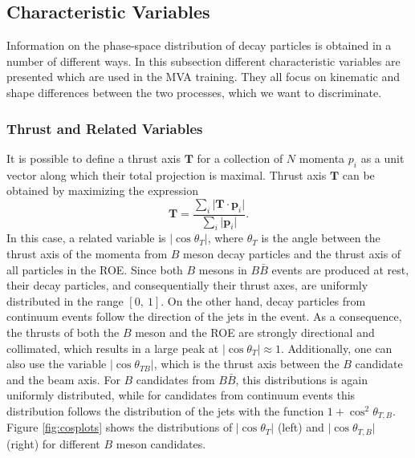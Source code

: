 \subsection{Characteristic Variables}
\label{ss:charvar}
Information on the phase-space distribution of decay particles is obtained in a number of different ways. In this subsection different characteristic variables are presented which are used in the MVA training. They all focus on kinematic and shape differences between the two processes, which we want to discriminate. 


\subsubsection{Thrust and Related Variables}
It is possible to define a thrust axis $\mathbf{T}$ for a collection of $N$ momenta $p_i$ as a unit vector along which their total projection is maximal. Thrust axis $\mathbf T$ can be obtained by maximizing the expression
\begin{equation}
\mathbf{T} = \frac{\sum_{i}\vert \mathbf{T} \cdot \mathbf{p}_i\vert}{\sum_{i}\vert \mathbf{p}_i\vert}.
\end{equation}
In this case, a related variable is $\vert \cos\theta_T\vert$, where $\theta_T$ is the angle between the thrust axis of the momenta from $B$ meson decay particles and the thrust axis of all particles in the ROE. Since both $B$ mesons in $B \bar B$ events are produced at rest, their decay particles, and consequentially their thrust axes, are uniformly distributed in the range $[0,~1]$. On the other hand, decay particles from continuum events follow the direction of the jets in the event. As a consequence, the thrusts of both the $B$ meson and the ROE are strongly directional and collimated, which results in a large peak at $\vert \cos\theta_T\vert \approx 1$. Additionally, one can also use the variable $\vert \cos\theta_{TB}\vert $, which is the thrust axis between the $B$ candidate and the beam axis. For $B$ candidates from $B \bar B$, this distributions is again uniformly distributed, while for candidates from continuum events this distribution follows the distribution of the jets with the function $1+\cos^2\theta_{T,B}$. Figure \ref{fig:cosplots} shows the distributions of $\vert \cos\theta_T\vert$ (left) and $\vert \cos\theta_{T,B}\vert$ (right) for different $B$ meson candidates.

